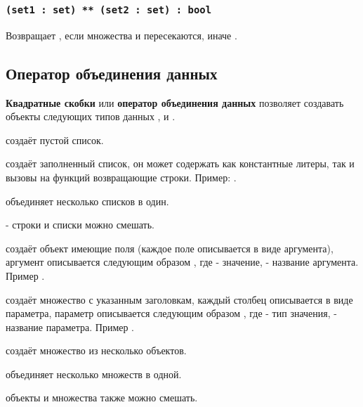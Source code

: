 \subsubsection{\lstinline|(set1 : set) ** (set2 : set) : bool|}

Возвращает \true, если множества  и  пересекаются, иначе \false.

\subsection{Оператор объединения данных}

{\bf Квадратные скобки} или {\bf оператор объединения данных} позволяет создавать объекты следующих типов данных \listtype{}, \set{} и \object{}.

 создаёт пустой список.

 создаёт заполненный список, он может содержать как константные литеры, так и вызовы на функций возвращающие строки. Пример: \code{["a", "b", "c"]}.

 объединяет несколько списков в один.

 - строки и списки можно смешать.

 создаёт объект имеющие поля (каждое поле описывается в виде аргумента), аргумент описывается следующим образом , где  - значение,  - название аргумента. Пример \code{[number = 2, str = "str"]}.

 создаёт множество с указанным заголовкам, каждый столбец описывается в виде параметра, параметр описывается следующим образом , где  - тип значения,  - название параметра. Пример .

 создаёт множество из несколько объектов.

 объединяет несколько множеств в одной.

 объекты и множества также можно смешать.

